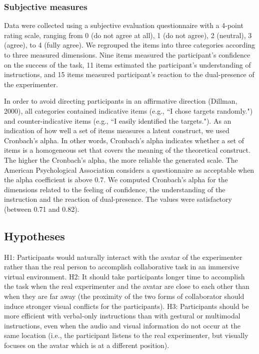 \subsubsection{Subjective measures}
Data were collected using a subjective evaluation questionnaire with a 4-point rating scale, ranging from 0 (do not agree at all), 1 (do not agree), 2 (neutral), 3 (agree), to 4 (fully agree). We regrouped the items into three categories according to three measured dimensions. Nine items measured the participant's confidence on the success of the task, 11 items estimated the participant's understanding of instructions, and 15 items measured participant's reaction to the dual-presence of the experimenter.

In order to avoid directing participants in an affirmative direction (Dillman, 2000), all categories contained indicative items (e.g., ``I chose targets randomly.") and counter-indicative items (e.g., ``I easily identified the targets."). As an indication of how well a set of items measures a latent construct, we used Cronbach's alpha. In other words, Cronbach's alpha indicates whether a set of items is a homogeneous set that covers the meaning of the theoretical construct. The higher the Cronbach's alpha, the more reliable the generated scale. The American Psychological Association considers a questionnaire as acceptable when the alpha coefficient is above 0.7. We computed Cronbach's alpha for the dimensions related to the feeling of confidence, the understanding of the instruction and the reaction of dual-presence. The values were satisfactory (between 0.71 and 0.82).

\subsection{Hypotheses}
H1: Participants would naturally interact with the avatar of the experimenter rather than the real person to accomplish collaborative task in an immersive virtual environment.
H2: It should take participants longer time to accomplish the task when the real experimenter and the avatar are close to each other than when they are far away (the proximity of the two forms of collaborator should induce stronger visual conflicts for the participants).
H3: Participants should be more efficient with verbal-only instructions than with gestural or multimodal instructions, even when the audio and visual information do not occur at the same location (i.e., the participant listens to the real experimenter, but visually focuses on the avatar which is at a different position).

